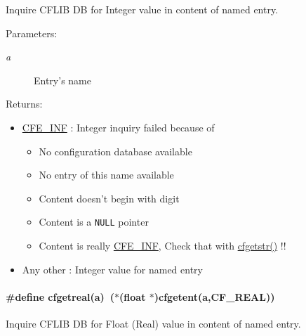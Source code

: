 Inquire CFLIB DB for Integer value in content of named entry. 

\begin{Desc}
\item[Parameters:]
\begin{description}
\item[{\em a}]Entry's name\end{description}
\end{Desc}
\begin{Desc}
\item[Returns:]\begin{itemize}
\item \hyperlink{group__errors_gc6a0861a0e376a94e540d7ba95ebe9cf}{CFE\_\-INF} : Integer inquiry failed because of\begin{itemize}
\item No configuration database available\item No entry of this name available\item Content doesn't begin with digit\item Content is a {\tt NULL} pointer\item Content is really \hyperlink{group__errors_gc6a0861a0e376a94e540d7ba95ebe9cf}{CFE\_\-INF}, Check that with \hyperlink{group__retrieval_g8cf5f53c5b05ec5ca4f5145010f84eb4}{cfgetstr()} !!\end{itemize}
\end{itemize}
\begin{itemize}
\item Any other : Integer value for named entry \end{itemize}
\end{Desc}
\hypertarget{group__retrieval_g5f5ec5179e69c2bdfb06ff38a5af16e4}{
\paragraph[{cfgetreal}]{\setlength{\rightskip}{0pt plus 5cm}\#define cfgetreal(a)~($\ast$(float $\ast$)cfgetent(a,CF\_\-REAL))}\hfill}
\label{group__retrieval_g5f5ec5179e69c2bdfb06ff38a5af16e4}


Inquire CFLIB DB for Float (Real) value in content of named entry. 

